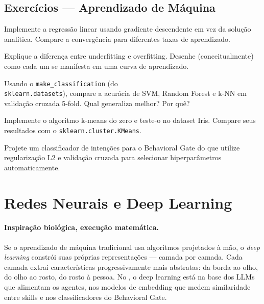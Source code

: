 \subsection{Exercícios — Aprendizado de Máquina}
\begin{exercicio}
Implemente a regressão linear usando gradiente descendente em vez da solução
analítica. Compare a convergência para diferentes taxas de aprendizado.
\end{exercicio}
\begin{exercicio}
Explique a diferença entre underfitting e overfitting. Desenhe (conceitualmente)
como cada um se manifesta em uma curva de aprendizado.
\end{exercicio}
\begin{exercicio}
Usando o \texttt{make\_classification} (do \\\hspace*{2em}\texttt{sklearn.datasets}), compare a acurácia
de SVM, Random Forest e k-NN em validação cruzada 5-fold. Qual generaliza
melhor? Por quê?
\end{exercicio}
\begin{exercicio}
Implemente o algoritmo k-means do zero e teste-o no dataset Iris. Compare
seus resultados com o \texttt{sklearn.cluster.KMeans}.
\end{exercicio}
\begin{exercicio}
Projete um classificador de intenções para o Behavioral Gate do
\opencodeeco{} que utilize regularização L2 e validação cruzada para
selecionar hiperparâmetros automaticamente.
\end{exercicio}
\section{Redes Neurais e Deep Learning}
\label{sec:redes-neurais}
\nivelintermediario

\paragraph{Inspiração biológica, execução matemática.} Se o aprendizado de
máquina tradicional usa algoritmos projetados à mão, o \textit{deep learning}
constrói suas próprias representações --- camada por camada. Cada camada
extrai características progressivamente mais abstratas: da borda ao olho, do
olho ao rosto, do rosto à pessoa. No \opencodeeco{}, o deep learning está
na base dos LLMs que alimentam os agentes, nos modelos de embedding que
medem similaridade entre skills e nos classificadores do Behavioral Gate.


